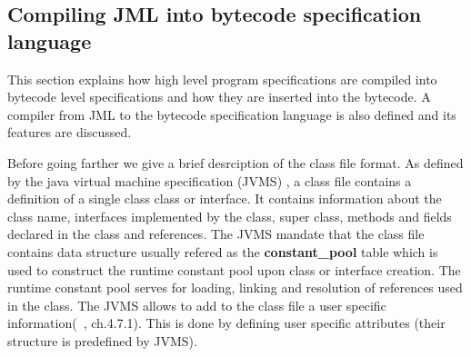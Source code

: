 \subsection{Compiling JML into bytecode specification language}

This section explains how high level program specifications are compiled into bytecode level specifications and how they are inserted into the bytecode. 
 A compiler from JML to the bytecode specification language is also defined and its features are discussed.


Before going farther we give a brief desrciption of the class file format. As defined by the java virtual machine  specification (JVMS) \cite{VMSpec}, a class file contains a definition of a single class class or interface. It contains information about the class name, interfaces implemented by the class, super class, methods and fields declared in the class and references. The JVMS mandate that the class file contains data structure usually refered as the \textbf{constant\_pool} table which is used to construct the runtime constant pool upon class or interface creation. The runtime constant pool serves for loading, linking and resolution of references used in the class. The JVMS allows to add to the class file a user specific information(~\cite{VMSpec}, ch.4.7.1). This is done by defining user specific attributes  (their structure is predefined by JVMS).

